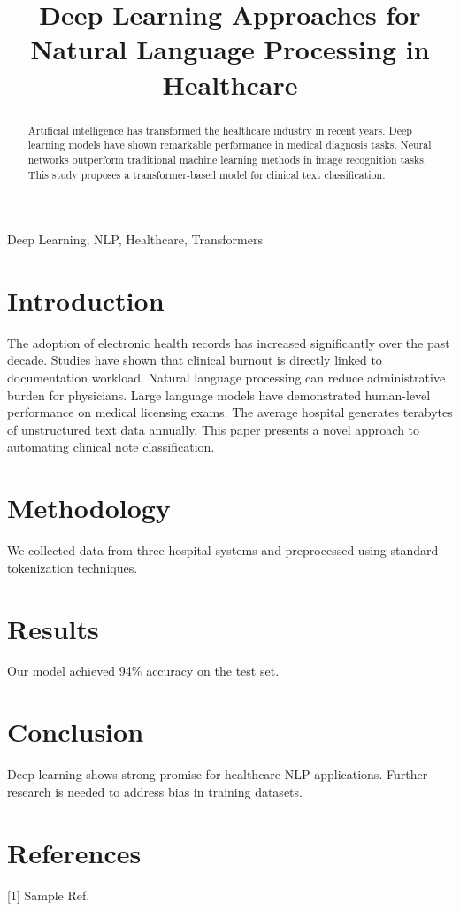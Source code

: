 \documentclass[conference]{IEEEtran}
\begin{document}
\title{Deep Learning Approaches for Natural Language Processing in Healthcare}

\author{
}

\maketitle

\begin{abstract}
Artificial intelligence has transformed the healthcare industry in recent years. Deep learning models have shown remarkable performance in medical diagnosis tasks. Neural networks outperform traditional machine learning methods in image recognition tasks. This study proposes a transformer-based model for clinical text classification.
\end{abstract}

\begin{IEEEkeywords}
Deep Learning, NLP, Healthcare, Transformers
\end{IEEEkeywords}

\section{Introduction}
The adoption of electronic health records has increased significantly over the past decade. Studies have shown that clinical burnout is directly linked to documentation workload. Natural language processing can reduce administrative burden for physicians. Large language models have demonstrated human-level performance on medical licensing exams. The average hospital generates terabytes of unstructured text data annually. This paper presents a novel approach to automating clinical note classification.

\section{Methodology}
We collected data from three hospital systems and preprocessed using standard tokenization techniques.

\section{Results}
Our model achieved 94\% accuracy on the test set.

\section{Conclusion}
Deep learning shows strong promise for healthcare NLP applications. Further research is needed to address bias in training datasets.

\section*{References}
[1] Sample Ref.
\end{document}
